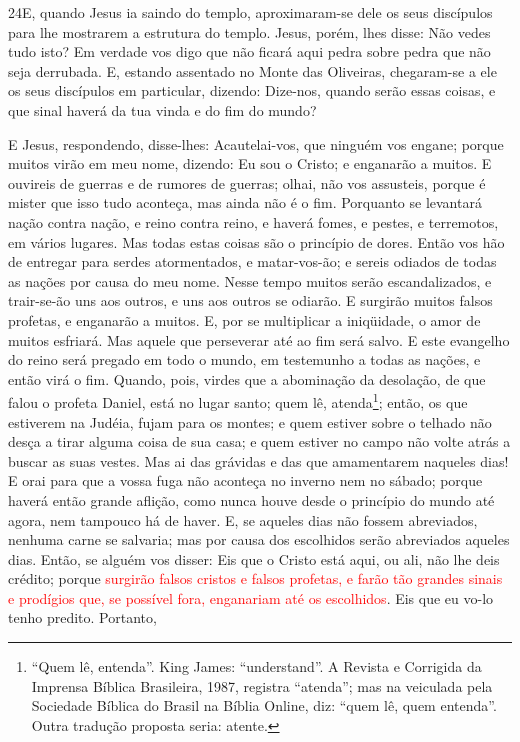\medskip

\lettrine{24} E, quando Jesus ia saindo do templo,
aproximaram-se dele os seus discípulos para lhe mostrarem a
estrutura do templo. Jesus, porém, lhes disse: Não vedes tudo
isto? Em verdade vos digo que não ficará aqui pedra sobre pedra que
não seja derrubada. E, estando assentado no Monte das Oliveiras,
chegaram-se a ele os seus discípulos em particular, dizendo:
Dize-nos, quando serão essas coisas, e que sinal haverá da tua vinda
e do fim do mundo?

E Jesus, respondendo, disse-lhes: Acautelai-vos, que ninguém vos
engane; porque muitos virão em meu nome, dizendo: Eu sou o
Cristo; e enganarão a muitos. E ouvireis de guerras e de rumores
de guerras; olhai, não vos assusteis, porque é mister que isso tudo
aconteça, mas ainda não é o fim. Porquanto se levantará nação
contra nação, e reino contra reino, e haverá fomes, e pestes, e
terremotos, em vários lugares. Mas todas estas coisas são o
princípio de dores. Então vos hão de entregar para serdes
atormentados, e matar-vos-ão; e sereis odiados de todas as nações
por causa do meu nome. Nesse tempo muitos serão
escandalizados, e trair-se-ão uns aos outros, e uns aos outros se
odiarão. E surgirão muitos falsos profetas, e enganarão a
muitos. E, por se multiplicar a iniqüidade, o amor de muitos
esfriará. Mas aquele que perseverar até ao fim será salvo.
E este evangelho do reino será pregado em todo o mundo, em
testemunho a todas as nações, e então virá o fim. Quando,
pois, virdes que a abominação da desolação, de que falou o profeta
Daniel, está no lugar santo; quem lê, atenda\footnote{``Quem lê,
entenda''. King James: ``understand''. A Revista e Corrigida da
Imprensa Bíblica Brasileira, 1987, registra ``atenda''; mas na
veiculada pela Sociedade Bíblica do Brasil na Bíblia Online, diz:
``quem lê, quem entenda''. Outra tradução proposta seria: atente.};
então, os que estiverem na Judéia, fujam para os montes;
e quem estiver sobre o telhado não desça a tirar alguma coisa
de sua casa; e quem estiver no campo não volte atrás a buscar
as suas vestes. Mas ai das grávidas e das que amamentarem
naqueles dias! E orai para que a vossa fuga não aconteça no
inverno nem no sábado; porque haverá então grande aflição,
como nunca houve desde o princípio do mundo até agora, nem tampouco
há de haver. E, se aqueles dias não fossem abreviados,
nenhuma carne se salvaria; mas por causa dos escolhidos serão
abreviados aqueles dias. Então, se alguém vos disser: Eis que
o Cristo está aqui, ou ali, não lhe deis crédito; porque
\textcolor{red}{surgirão falsos cristos e falsos profetas, e farão tão
grandes sinais e prodígios que, se possível fora, enganariam até os
escolhidos}. Eis que eu vo-lo tenho predito. Portanto,
